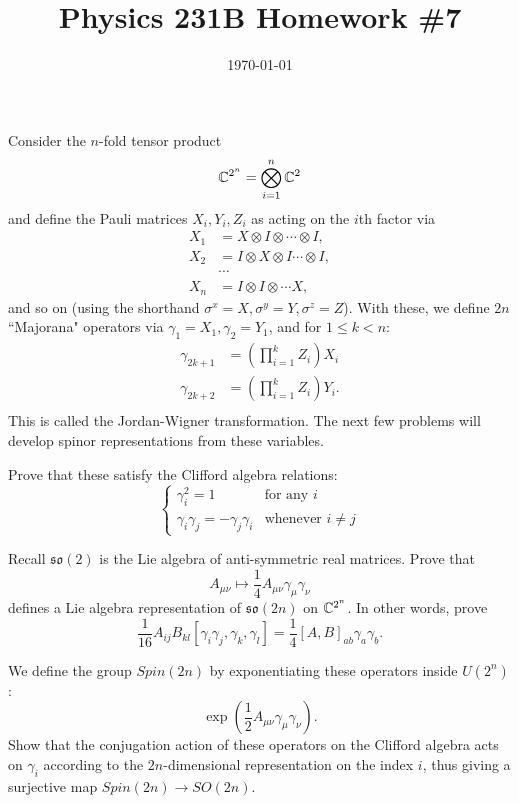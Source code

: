 \documentclass{article}
\date{\today}
\title{Physics 231B Homework \#7}
\begin{document}
\maketitle

Consider the $n$-fold tensor product
\[ \mathbb{C}^{2^n} = \bigotimes_{i=1}^n \mathbb{C}^2 \]
and define the Pauli matrices $X_i, Y_i, Z_i$ as acting on the $i$th factor via
\begin{align*}
    X_1 &= X \otimes I \otimes \cdots \otimes I, \\
    X_2 &= I \otimes X \otimes I \cdots \otimes I, \\
        & \cdots \\
    X_n &= I \otimes I \otimes \cdots X,
\end{align*}
and so on (using the shorthand $\sigma^x = X, \sigma^y=Y, \sigma^z=Z$). With these, we define $2n$ ``Majorana" operators via $\gamma_1=X_1, \gamma_2=Y_1$, and for $1 \leq k < n$:
\begin{align*}
    \gamma_{2k+1} &= \left( \prod_{i=1}^k Z_i \right) X_i \\
    \gamma_{2k+2} &= \left( \prod_{i=1}^k Z_i \right) Y_i. \\
\end{align*}
This is called the Jordan-Wigner transformation. The next few problems will develop spinor representations from these variables.

\bigskip
\begin{prob}
    Prove that these satisfy the Clifford algebra relations:
    \[ \begin{cases}
        \gamma_i^2=1 & \text{for any $i$} \\
        \gamma_i\gamma_j = -\gamma_j\gamma_i & \text{whenever $i \neq j$}
    \end{cases} \]
\end{prob}

\bigskip
\begin{prob}
    Recall $\mathfrak{so}(2)$ is the Lie algebra of anti-symmetric real matrices. Prove that
    \[ A_{\mu \nu} \mapsto \frac{1}{4} A_{\mu \nu} \gamma_\mu \gamma_\nu \]
    defines a Lie algebra representation of $\mathfrak{so}(2n)$ on $\mathbb{C}^{2^n}$. In other words, prove
    \[ \frac{1}{16} A_{ij}B_{kl} [\gamma_i\gamma_j,\gamma_k,\gamma_l] = \frac{1}{4} [A,B]_{ab} \gamma_a \gamma_b. \]
\end{prob}

\bigskip
\begin{prob}
    We define the group $Spin(2n)$ by exponentiating these operators inside $U(2^n)$:
    \[ \exp \left( \frac{1}{2} A_{\mu \nu} \gamma_\mu \gamma_\nu \right). \]
    Show that the conjugation action of these operators on the Clifford algebra acts on $\gamma_i$ according to the $2n$-dimensional representation on the index $i$, thus giving a surjective map $Spin(2n) \rightarrow SO(2n)$.
\end{prob}
\end{document}
